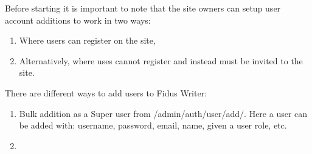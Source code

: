 \documentclass{article}
\begin{document}
Before starting it is important to note that the site owners can setup user account additions to work in two ways:

\begin{enumerate}
\item Where users can register on the site,


\item Alternatively, where uses cannot register and instead must be invited to the site.


\end{enumerate}

There are different ways to add users to Fidus Writer:

\begin{enumerate}
\item Bulk addition as a Super user from /admin/auth/user/add/. Here a user can be added with: username, password, email, name, given a user role, etc.


\item 


\end{enumerate}

\subsection{}\label{H5769420}
\end{document}
